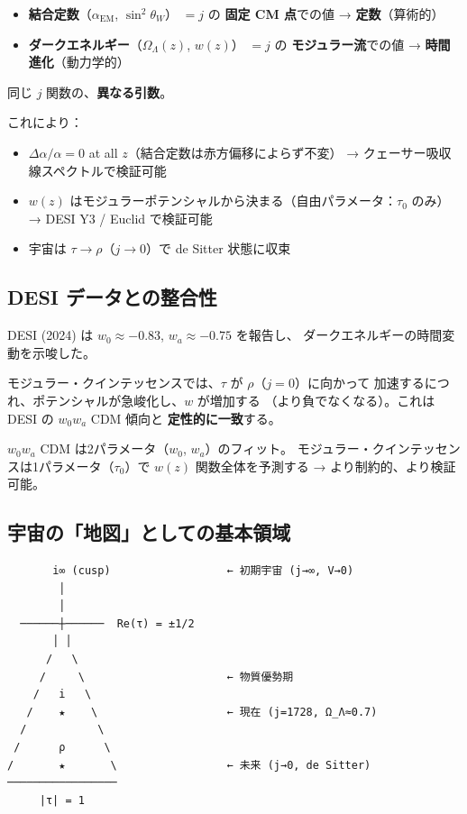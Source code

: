 \begin{keybox}[算術と動力学の分離]
\begin{itemize}
\item \textbf{結合定数}（$\alpha_{\mathrm{EM}}$, $\sin^2\theta_W$）
  $= j$ の \textbf{固定 CM 点}での値 → \textbf{定数}（算術的）
\item \textbf{ダークエネルギー}（$\Omega_\Lambda(z)$, $w(z)$）
  $= j$ の \textbf{モジュラー流}での値 → \textbf{時間進化}（動力学的）
\end{itemize}
同じ $j$ 関数の、\textbf{異なる引数}。
\end{keybox}

\noindent
これにより：
\begin{itemize}
\item $\Delta\alpha/\alpha = 0$ at all $z$（結合定数は赤方偏移によらず不変）
  → クェーサー吸収線スペクトルで検証可能
\item $w(z)$ はモジュラーポテンシャルから決まる（自由パラメータ：$\tau_0$ のみ）
  → DESI Y3 / Euclid で検証可能
\item 宇宙は $\tau \to \rho$（$j \to 0$）で de Sitter 状態に収束
\end{itemize}

\subsection{DESI データとの整合性}

DESI (2024) は $w_0 \approx -0.83$, $w_a \approx -0.75$ を報告し、
ダークエネルギーの時間変動を示唆した。

モジュラー・クインテッセンスでは、$\tau$ が $\rho$（$j = 0$）に向かって
加速するにつれ、ポテンシャルが急峻化し、$w$ が増加する
（より負でなくなる）。これは DESI の $w_0 w_a$ CDM 傾向と
\textbf{定性的に一致}する。

$w_0 w_a$ CDM は2パラメータ（$w_0$, $w_a$）のフィット。
モジュラー・クインテッセンスは1パラメータ（$\tau_0$）で
$w(z)$ 関数全体を予測する → より制約的、より検証可能。

\subsection{宇宙の「地図」としての基本領域}

\begin{verbatim}
       i∞ (cusp)                  ← 初期宇宙 (j→∞, V→0)
        │
        │
  ──────┼──────  Re(τ) = ±1/2
       │ │
      /   \
     /     \                      ← 物質優勢期
    /   i   \
   /    ★    \                    ← 現在 (j=1728, Ω_Λ≈0.7)
  /           \
 /      ρ      \
/       ★       \                 ← 未来 (j→0, de Sitter)
─────────────────
     |τ| = 1
\end{verbatim}

